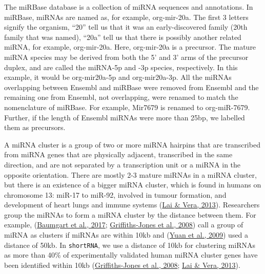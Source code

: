 \documentclass[12pt,twoside]{reedthesis}
\begin{document}
The miRBase database is a collection of miRNA sequences and annotations.
In miRBase, miRNAs are named as, for example, org-mir-20a. The first 3
letters signify the organism, ``20'' tell us that it was an
early-discovered family (20th family that was named), ``20a'' tell us that
there is possibly another related miRNA, for example, org-mir-20a. Here,
org-mir-20a is a precursor. The mature miRNA species may be derived from
both the 5' and 3' arms of the precursor duplex, and are called the
miRNA-5p and -3p species, respectively. In this example, it would be
org-mir20a-5p and org-mir20a-3p. All the miRNAs overlapping between
Ensembl and miRBase were removed from Ensembl and the remaining one from
Ensembl, not overlapping, were renamed to match the nomenclature of
miRBase. For example, Mir7679 is renamed to org-miR-7679. Further, if
the length of Ensembl miRNAs were more than 25bp, we labelled them as
precursors.

A miRNA cluster is a group of two or more miRNA hairpins that are
transcribed from miRNA genes that are physically adjacent, transcribed
in the same direction, and are not separated by a transcription unit or
a miRNA in the opposite orientation. There are mostly 2-3 mature miRNAs
in a miRNA cluster, but there is an existence of a bigger miRNA cluster,
which is found in humans on chromosome 13: miR-17 to miR-92, involved in
tumour formation, and development of heart lungs and immune systems
(\protect\hyperlink{ref-lai2013}{Lai \& Vera, 2013}). Researchers group the miRNAs to form a miRNA cluster by the
distance between them. For example, (\protect\hyperlink{ref-baumgart2017}{Baumgart et al., 2017}; \protect\hyperlink{ref-griffiths-jones2008}{Griffiths-Jones et al., 2008}) call a group of miRNA as clusters if miRNAs are within
10kb and (\protect\hyperlink{ref-yuan2009}{Yuan et al., 2009}) used a distance of 50kb. In \texttt{shortRNA}, we use a
distance of 10kb for clustering miRNAs as more than 40\% of
experimentally validated human miRNA cluster genes have been identified
within 10kb (\protect\hyperlink{ref-griffiths-jones2008}{Griffiths-Jones et al., 2008}; \protect\hyperlink{ref-lai2013}{Lai \& Vera, 2013}).
\end{document}
